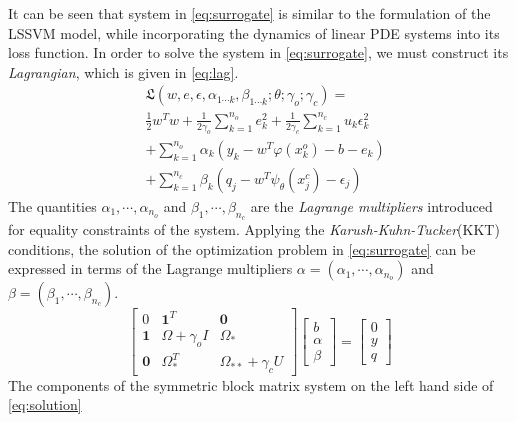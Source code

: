 It can be seen that system in \cref{eq:surrogate} is similar to the formulation of the LSSVM model, 
while incorporating the dynamics of linear PDE systems into its loss function. In order to solve 
the system in \cref{eq:surrogate}, we must construct its \emph{Lagrangian}, which is given in 
\cref{eq:lag}.
%
\begin{equation}\label{eq:lag}
  \begin{aligned}
    & \mathfrak{L}(
      w, e,\epsilon, \alpha_{1 \cdots k}, \beta_{1 \cdots k}; \theta; \gamma_{o}; \gamma_{c}
    ) = \\ 
    & \frac{1}{2} w^{T}w + \frac{1}{2\gamma_{o}} \sum_{k = 1}^{n_{o}}{e^{2}_{k}} +
    \frac{1}{2\gamma_{c}} \sum_{k = 1}^{n_{c}}{u_{k} \epsilon^{2}_{k}} \\
    & + \sum_{k = 1}^{n_{o}}{\alpha_{k}(y_{k} - w^{T}\varphi(x^{o}_{k}) - b - e_{k})} \\
    & + \sum_{k = 1}^{n_{c}}{\beta_{k} (q_{j} - w^{T}\psi_{\theta}(x^{c}_{j}) - \epsilon_{j})} 
  \end{aligned}
\end{equation}
%
The quantities $\alpha_{1}, \cdots, \alpha_{n_{o}}$ and $\beta_{1}, \cdots, \beta_{n_{c}}$ are the 
\emph{Lagrange multipliers} introduced for equality constraints of the system. Applying the 
\emph{Karush-Kuhn-Tucker}(KKT) conditions, the solution of the optimization problem in 
\cref{eq:surrogate} can be expressed in terms of the Lagrange multipliers 
$\alpha = (\alpha_{1}, \cdots, \alpha_{n_{o}})$ and $\beta = (\beta_{1}, \cdots, \beta_{n_{c}})$.
%
\begin{equation}\label{eq:solution}
  \begin{bmatrix}
    0 & \mathbf{1}^{T} & \mathbf{0} \\ 
    \mathbf{1} & \Omega + \gamma_{o}I  & \Omega_*\\ 
    \mathbf{0} & \Omega_{*}^{T}  & \Omega_{**} + \gamma_{c}U 
  \end{bmatrix} \begin{bmatrix}
    b\\ 
    \alpha\\ 
    \beta
  \end{bmatrix} = \begin{bmatrix}
    0\\ 
    y\\ 
    q
  \end{bmatrix}
\end{equation}
%
The components of the symmetric block matrix system on the left hand side of \cref{eq:solution} 
